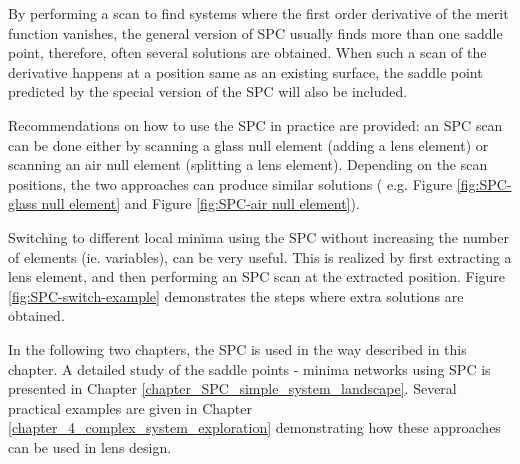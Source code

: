 By performing a scan to find systems where the first order derivative of the merit function vanishes, the general version of SPC usually finds more than one saddle point, therefore, often several solutions are obtained. When such a scan of the derivative happens at a position same as an existing surface, the saddle point predicted by the special version of the SPC will also be included. 

Recommendations on how to use the SPC in practice are provided: an SPC scan can be done either by scanning a glass null element (adding a lens element) or scanning an air null element (splitting a lens element).  Depending on the scan positions, the two approaches can produce similar solutions ( e.g. Figure \ref{fig:SPC-glass null element} and Figure \ref{fig:SPC-air null element}).

Switching to different local minima using the SPC without increasing the number of elements (ie. variables), can be very useful. This is realized by first extracting a lens element, and then performing an SPC scan at the extracted position. Figure \ref{fig:SPC-switch-example} demonstrates the steps where extra solutions are obtained. 

In the following two chapters, the SPC is used in the way described in this chapter. A detailed study of the saddle points - minima networks using SPC is presented in Chapter \ref{chapter_SPC_simple_system_landscape}. Several practical examples are given in Chapter \ref{chapter_4_complex_system_exploration} demonstrating how these approaches can be used in lens design. 



